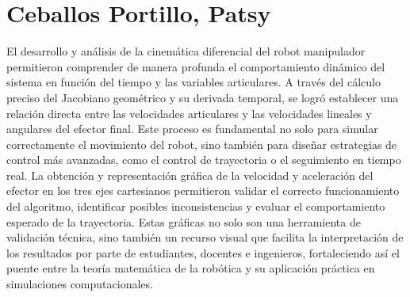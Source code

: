 \section{Ceballos Portillo, Patsy}
El desarrollo y análisis de la cinemática diferencial del robot manipulador permitieron comprender de manera profunda el comportamiento dinámico del sistema en función del tiempo y las variables articulares. A través del cálculo preciso del Jacobiano geométrico y su derivada temporal, se logró establecer una relación directa entre las velocidades articulares y las velocidades lineales y angulares del efector final. Este proceso es fundamental no solo para simular correctamente el movimiento del robot, sino también para diseñar estrategias de control más avanzadas, como el control de trayectoria o el seguimiento en tiempo real. La obtención y representación gráfica de la velocidad y aceleración del efector en los tres ejes cartesianos permitieron validar el correcto funcionamiento del algoritmo, identificar posibles inconsistencias y evaluar el comportamiento esperado de la trayectoria. Estas gráficas no solo son una herramienta de validación técnica, sino también un recurso visual que facilita la interpretación de los resultados por parte de estudiantes, docentes e ingenieros, fortaleciendo así el puente entre la teoría matemática de la robótica y su aplicación práctica en simulaciones computacionales.